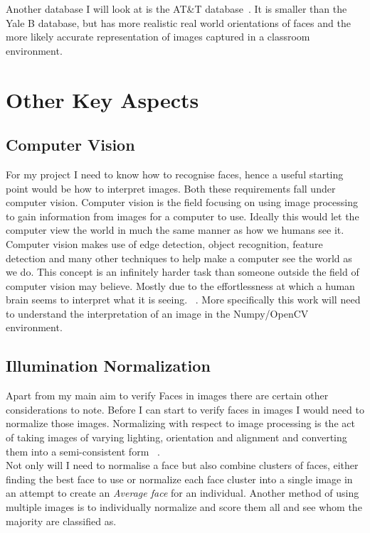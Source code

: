 		Another database I will look at is the AT\&T database~\cite{ATTDATA}.  It is smaller than the Yale B database, but has more realistic real 
		world orientations of faces and the more likely accurate representation of images captured in a classroom environment.
	
\section{Other Key Aspects}
	\subsection{Computer Vision}
		For my project I need to know how to recognise faces, hence a useful starting point would be how to interpret images.  
		Both these requirements fall under computer vision.  Computer vision is the field focusing on using image processing 
		to gain information from images for a computer to use.  Ideally this would let the computer view the world in much 
		the same manner as how we humans see it. \\
		
		Computer vision makes use of edge detection, object recognition, feature detection and many other techniques to help 
		make a computer see the world as we do.  This concept is an infinitely harder task than someone outside the field of 
		computer vision may believe.  Mostly due to the effortlessness at which a human brain seems to interpret what it is seeing.
		~\cite{szeliski2010computer}.  More specifically this work will need to understand the interpretation of an image in 
		the Numpy/OpenCV environment.
		
	\subsection{Illumination Normalization}
		Apart from my main aim to verify Faces in images there are certain other considerations to note.  Before I can start 
		to verify faces in images I would need to normalize those images.  Normalizing with respect to image processing is the 
		act of taking images of varying lighting, orientation and alignment and converting them into a semi-consistent form
		~\cite{FDGFN2009}.  \\
		
		Not only will I need to normalise a face but also combine clusters of faces, either finding the best face to use or 
		normalize each face cluster into a single image in an attempt to create an \emph{Average face} for an individual.  
		Another method of using multiple images is to individually normalize and score them all and see whom the majority 
		are classified as.
		
